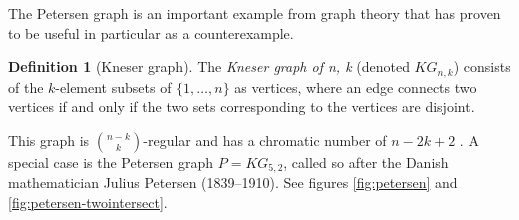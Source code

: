 \documentclass[12pt,            %
               a4paper,         %
               oneside,         %
               DIV12,           %
               fleqn,           %
               halfparskip,     %
               nochapterprefix, %
              ]{scrartcl} %
\theoremstyle{definition}
\newtheorem{definition}{Definition}
\begin{document}
The Petersen graph is an important example from graph theory that has
proven to be useful in particular as a counterexample.

\begin{definition}[Kneser graph]
  The \emph{Kneser graph of n, k} (denoted $KG_{n,k}$) consists of
  the $k$-element subsets of $\{1,\ldots,n\}$ as vertices, where an
  edge connects two vertices if and only if the two sets corresponding
  to the vertices are disjoint.
\end{definition}

This graph is ${n-k}\choose k$-regular and has a chromatic number of
$n - 2k + 2$ \cite{kneser}. A special case is the Petersen graph $P =
KG_{5,2}$, called so after the Danish mathematician Julius Petersen
(1839--1910). See figures \ref{fig:petersen} and
\ref{fig:petersen-twointersect}.
\end{document}
